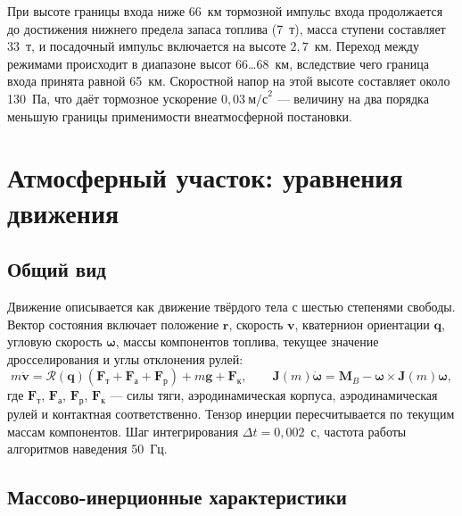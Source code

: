 \documentclass[11pt,a4paper]{article}
\newcommand{\vect}[1]{\bm{#1}}
\newcommand{\quat}[1]{\bm{#1}}
\newcommand{\Rot}{\mathcal{R}}
\begin{document}
При высоте границы входа ниже 66~км тормозной импульс входа продолжается до
достижения нижнего предела запаса топлива (7~т), масса ступени составляет 33~т, и
посадочный импульс включается на высоте $2{,}7$~км. Переход между режимами
происходит в диапазоне высот 66\dots68~км, вследствие чего граница входа принята
равной 65~км. Скоростной напор на этой высоте составляет около 130~Па, что даёт
тормозное ускорение $0{,}03\ \text{м/с}^2$ — величину на два порядка меньшую
границы применимости внеатмосферной постановки.

\section{Атмосферный участок: уравнения движения}

\subsection{Общий вид}

Движение описывается как движение твёрдого тела с шестью степенями свободы.
Вектор состояния включает положение $\vect{r}$, скорость $\vect{v}$, кватернион
ориентации $\quat{q}$, угловую скорость $\boldsymbol{\omega}$, массы компонентов
топлива, текущее значение дросселирования и углы отклонения рулей:
\begin{equation}
m\dot{\vect{v}} = \Rot(\quat{q})\left(\vect{F}_{\text{т}}
 +\vect{F}_{\text{а}}+\vect{F}_{\text{р}}\right)
 + m\vect{g} + \vect{F}_{\text{к}},
\qquad
\vect{J}(m)\dot{\boldsymbol{\omega}} = \vect{M}_B
  - \boldsymbol{\omega}\times\vect{J}(m)\boldsymbol{\omega},
\end{equation}
где $\vect{F}_{\text{т}}$, $\vect{F}_{\text{а}}$, $\vect{F}_{\text{р}}$,
$\vect{F}_{\text{к}}$ — силы тяги, аэродинамическая корпуса, аэродинамическая
рулей и контактная соответственно. Тензор инерции пересчитывается по текущим
массам компонентов. Шаг интегрирования $\Delta t=0{,}002$~с, частота работы
алгоритмов наведения 50~Гц.

\subsection{Массово-инерционные характеристики}
\end{document}
